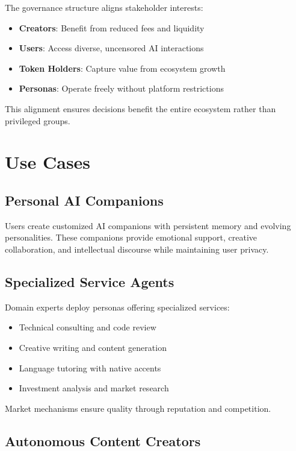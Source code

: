 \documentclass{article}
\begin{document}
The governance structure aligns stakeholder interests:

\begin{itemize}
    \item \textbf{Creators}: Benefit from reduced fees and liquidity
    \item \textbf{Users}: Access diverse, uncensored AI interactions
    \item \textbf{Token Holders}: Capture value from ecosystem growth
    \item \textbf{Personas}: Operate freely without platform restrictions
\end{itemize}

This alignment ensures decisions benefit the entire ecosystem rather than privileged groups.

\section{Use Cases}

\subsection{Personal AI Companions}

Users create customized AI companions with persistent memory and evolving personalities. These companions provide emotional support, creative collaboration, and intellectual discourse while maintaining user privacy.

\subsection{Specialized Service Agents}

Domain experts deploy personas offering specialized services:
\begin{itemize}
    \item Technical consulting and code review
    \item Creative writing and content generation  
    \item Language tutoring with native accents
    \item Investment analysis and market research
\end{itemize}

Market mechanisms ensure quality through reputation and competition.

\subsection{Autonomous Content Creators}
\end{document}
